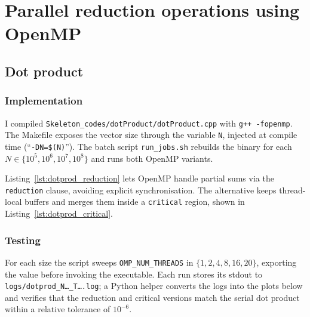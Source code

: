 \section{Parallel reduction operations using OpenMP }

\subsection{Dot product}

\subsubsection{Implementation}
I compiled \texttt{Skeleton\_codes/dotProduct/dotProduct.cpp} with \texttt{g++ -fopenmp}. The Makefile exposes the vector size through the variable \texttt{N}, injected at compile time (``\texttt{-DN=\$(N)}''). The batch script \texttt{run\_jobs.sh} rebuilds the binary for each $N \in \{10^5,10^6,10^7,10^8\}$ and runs both OpenMP variants.



Listing~\ref{lst:dotprod_reduction} lets OpenMP handle partial sums via the \texttt{reduction} clause, avoiding explicit synchronisation. The alternative keeps thread-local buffers and merges them inside a \texttt{critical} region, shown in Listing~\ref{lst:dotprod_critical}.




\subsubsection{Testing}
For each size the script sweeps \texttt{OMP\_NUM\_THREADS} in $\{1,2,4,8,16,20\}$, exporting the value before invoking the executable. Each run stores its stdout to \texttt{logs/dotprod\_N\ldots\_T\ldots.log}; a Python helper converts the logs into the plots below and verifies that the reduction and critical versions match the serial dot product within a relative tolerance of $10^{-6}$.

